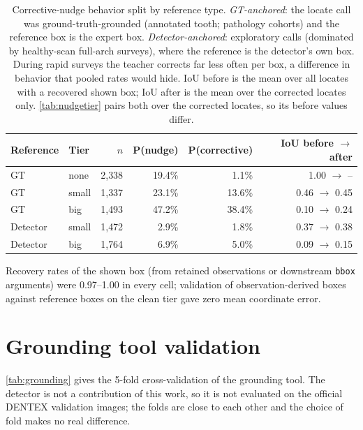 \begin{table}[htbp]
  \centering
  \small
  \caption{Corrective-nudge behavior split by reference type. \emph{GT-anchored}: the locate call was ground-truth-grounded (annotated tooth;
  pathology cohorts) and the reference box is the expert box. \emph{Detector-anchored}:
  exploratory calls (dominated by healthy-scan full-arch surveys), where the reference is the
  detector's own box. During rapid surveys the teacher corrects far less often per box, a
  difference in behavior that pooled rates would hide. IoU before is the mean over all locates with a
  recovered shown box; IoU after is the mean over the corrected locates only. \cref{tab:nudgetier} pairs both
  over the corrected locates, so its before values differ.}
  \label{tab:mechanismsplit}
  \begin{tabular}{llrrrr}
    \toprule
    Reference & Tier & $n$ & P(nudge) & P(corrective) & IoU before $\to$ after \\
    \midrule
    GT & none & 2{,}338 & 19.4\% & 1.1\% & 1.00 $\to$ -- \\
    GT & small & 1{,}337 & 23.1\% & 13.6\% & 0.46 $\to$ 0.45 \\
    GT & big & 1{,}493 & 47.2\% & 38.4\% & 0.10 $\to$ 0.24 \\
    \midrule
    Detector & small & 1{,}472 & 2.9\% & 1.8\% & 0.37 $\to$ 0.38 \\
    Detector & big & 1{,}764 & 6.9\% & 5.0\% & 0.09 $\to$ 0.15 \\
    \bottomrule
  \end{tabular}
\end{table}

Recovery rates of the shown box (from retained observations or downstream \texttt{bbox}
arguments) were 0.97--1.00 in every cell; validation of observation-derived boxes against
reference boxes on the clean tier gave zero mean coordinate error.

\section{Grounding tool validation}
\label{app:grounding}

\cref{tab:grounding} gives the 5-fold cross-validation of the grounding tool. The detector is
not a contribution of this work, so it is not evaluated on the official DENTEX validation images;
the folds are close to each other and the choice of fold makes no real difference.

